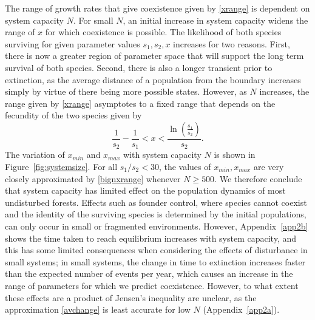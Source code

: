 The range of growth rates that give coexistence given by \eqref{xrange} is dependent on system capacity $N$. For small $N$, an initial increase in system capacity widens the range of $x$ for which coexistence is possible. The likelihood of both species surviving for given parameter values $s_1,s_2,x$ increases for two reasons. First, there is now a greater region of parameter space that will support the long term survival of both species. Second, there is also a longer transient prior to extinction, as the average distance of a population from the boundary increases simply by virtue of there being more possible states. 
 However, as $N$ increases, the range given by \eqref{xrange} asymptotes to a fixed range that  depends on the fecundity of the two species given by
\begin{equation}
\label{bignxrange}
\frac{1}{s_2}-\frac{1}{s_1}<x<\frac{\ln\left(\frac{s_1}{s_2}\right)}{s_2}.
\end{equation}  
The variation of $x_{min}$ and $x_{max}$ with system capacity $N$ is shown in Figure~\ref{fig:systemsize}. For all $s_1/s_2<30$, the values of $x_{min},x_{max}$ are very closely approximated by \eqref{bignxrange} whenever $N\geq 500$. We therefore conclude that system capacity has limited effect on the population dynamics of most undisturbed forests. Effects such as founder control, where species cannot coexist and the identity of the surviving species is determined by the initial populations, can only occur in small or fragmented environments.
 However, Appendix~\ref{app2b} shows the time taken to reach equilibrium increases with system capacity, and this has some limited consequences when considering the effects of disturbance in small systems; in small systems, the change in time to extinction increases faster than the expected number of events per year, which causes an increase in the range of parameters for which we predict coexistence. However, to what extent these effects are a product of Jensen's inequality are unclear, as the approximation \eqref{avchange} is least accurate for low $N$ (Appendix~\ref{app2a}). 
